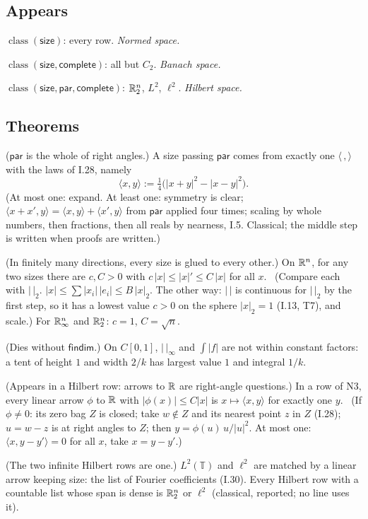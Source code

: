 \subsection*{Appears}

\begin{lines}
\item[\lab{N1}] $\operatorname{class}(\mathsf{size})$: every row. \emph{Normed space.}
\item[\lab{N2}] $\operatorname{class}(\mathsf{size}, \mathsf{complete})$: all but $C_2$. \emph{Banach space.}
\item[\lab{N3}] $\operatorname{class}(\mathsf{size}, \mathsf{par}, \mathsf{complete})$: $\mathbb{R}^n_2$, $L^2$, $\ell^2$. \emph{Hilbert space.}
\end{lines}

\subsection*{Theorems}

\begin{lines}
\item[\lab{T1}] ($\mathsf{par}$ is the whole of right angles.) A size passing $\mathsf{par}$ comes from exactly one $\langle\,,\rangle$ with the laws of I.28, namely \[ \langle x, y \rangle := \tfrac14 \big( |x + y|^2 - |x - y|^2 \big) . \] (At most one: expand. At least one: symmetry is clear; $\langle x + x', y\rangle = \langle x, y\rangle + \langle x', y\rangle$ from $\mathsf{par}$ applied four times; scaling by whole numbers, then fractions, then all reals by nearness, I.5. Classical; the middle step is written when proofs are written.)
\item[\lab{T2}] (In finitely many directions, every size is glued to every other.) On $\mathbb{R}^n$, for any two sizes there are $c, C > 0$ with $c\,|x| \le |x|' \le C\,|x|$ for all $x$. \ (Compare each with $|\,|_2$. $|x| \le \sum |x_i|\,|e_i| \le B\,|x|_2$. The other way: $|\,|$ is continuous for $|\,|_2$ by the first step, so it has a lowest value $c > 0$ on the sphere $|x|_2 = 1$ (I.13, T7), and scale.) For $\mathbb{R}^n_\infty$ and $\mathbb{R}^n_2$: $c = 1$, $C = \sqrt n$.
\item[\lab{T3}] (Dies without $\mathsf{findim}$.) On $C[0, 1]$, $|\,|_\infty$ and $\int |f|$ are not within constant factors: a tent of height $1$ and width $2/k$ has largest value $1$ and integral $1/k$.
\item[\lab{T4}] (Appears in a Hilbert row: arrows to $\mathbb{R}$ are right-angle questions.) In a row of N3, every linear arrow $\phi$ to $\mathbb{R}$ with $|\phi(x)| \le C|x|$ is $x \mapsto \langle x, y\rangle$ for exactly one $y$. \ (If $\phi \ne 0$: its zero bag $Z$ is closed; take $w \notin Z$ and its nearest point $z$ in $Z$ (I.28); $u = w - z$ is at right angles to $Z$; then $y = \phi(u)\, u / |u|^2$. At most one: $\langle x, y - y'\rangle = 0$ for all $x$, take $x = y - y'$.)
\item[\lab{T5}] (The two infinite Hilbert rows are one.) $L^2(\mathbb{T})$ and $\ell^2$ are matched by a linear arrow keeping size: the list of Fourier coefficients (I.30). Every Hilbert row with a countable list whose span is dense is $\mathbb{R}^n_2$ or $\ell^2$ (classical, reported; no line uses it).
\end{lines}

